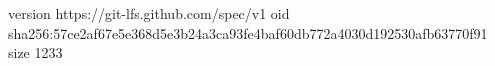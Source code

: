 version https://git-lfs.github.com/spec/v1
oid sha256:57ce2af67e5e368d5e3b24a3ca93fe4baf60db772a4030d192530afb63770f91
size 1233

